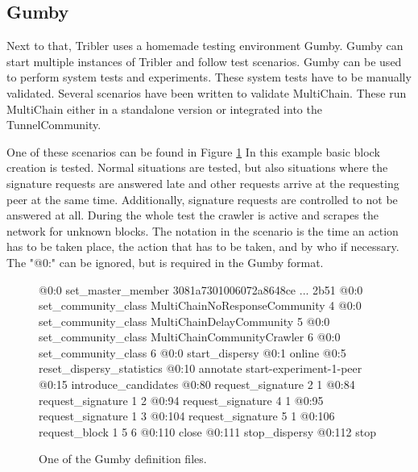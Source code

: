 \subsection{Gumby}
\label{subsect:gumby}
Next to that, Tribler uses a homemade testing environment Gumby.
Gumby can start multiple instances of Tribler and follow test scenarios.
Gumby can be used to perform system tests and experiments.
These system tests have to be manually validated.
Several scenarios have been written to validate MultiChain.
These run MultiChain either in a standalone version or integrated into the TunnelCommunity.

One of these scenarios can be found in Figure \ref{fig:exp-gumby-scenario}
In this example basic block creation is tested.
Normal situations are tested,
but also situations where the signature requests are answered late
and other requests arrive at the requesting peer at the same time.
Additionally, signature requests are controlled to not be answered at all.
During the whole test the crawler is active and scrapes the network for unknown blocks.
The notation in the scenario is the time an action has to be taken place,
the action that has to be taken, and by who if necessary.
The "@0:" can be ignored, but is required in the Gumby format.

\begin{figure}
\begin{FVerbatim}[fontsize=\small]
@0:0 set_master_member 3081a7301006072a8648ce ... 2b51
@0:0 set_community_class MultiChainNoResponseCommunity {4}
@0:0 set_community_class MultiChainDelayCommunity {5}
@0:0 set_community_class MultiChainCommunityCrawler {6}
@0:0 set_community_class {6}
@0:0 start_dispersy
@0:1 online
@0:5 reset_dispersy_statistics
@0:10 annotate start-experiment-1-peer
@0:15 introduce_candidates
@0:80 request_signature 2 {1}
@0:84 request_signature 1 {2}
@0:94 request_signature 4 {1}
@0:95 request_signature 1 {3}
@0:104 request_signature 5 {1}
@0:106 request_block 1 5 {6}
@0:110 close
@0:111 stop_dispersy
@0:112 stop
\end{FVerbatim}
    \caption{One of the Gumby definition files.}
    \label{fig:exp-gumby-scenario}
\end{figure}